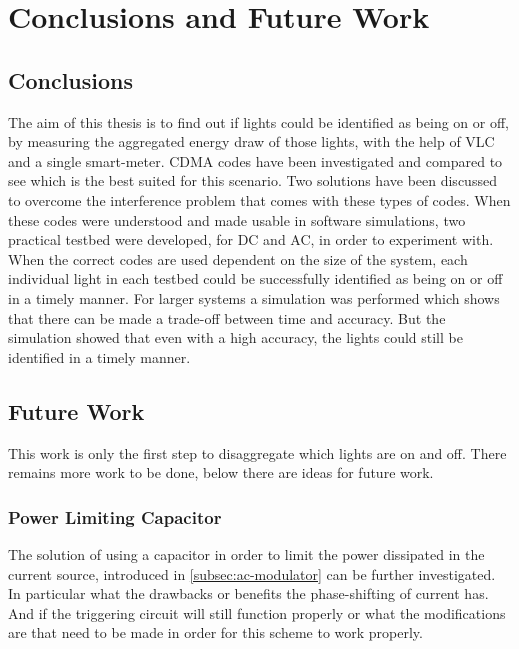 
\chapter{Conclusions and Future Work}
\label{chp:conclusionsandfuturework}

	\section{Conclusions}


	The aim of this thesis is to find out if lights could be identified as being on or off, by measuring the aggregated energy draw of those lights, with the help of VLC and a single smart-meter.
	CDMA codes have been investigated and compared to see which is the best suited for this scenario.
	Two solutions have been discussed to overcome the interference problem that comes with these types of codes.
	When these codes were understood and made usable in software simulations, two practical testbed were developed, for DC and AC, in order to experiment with.
	When the correct codes are used dependent on the size of the system, each individual light in each testbed could be successfully identified as being on or off in a timely manner.
	For larger systems a simulation was performed which shows that there can be made a trade-off between time and accuracy. 
	But the simulation showed that even with a high accuracy, the lights could still be identified in a timely manner.






\section{Future Work}


This work is only the first step to disaggregate which lights are on and off.
There remains more work to be done, below there are ideas for future work.

	\subsection{Power Limiting Capacitor}

	The solution of using a capacitor in order to limit the power dissipated in the current source, introduced in \autoref{subsec:ac-modulator} can be further investigated.
	In particular what the drawbacks or benefits the phase-shifting of current has.
	And if the triggering circuit will still function properly or what the modifications are that need to be made in order for this scheme to work properly.


